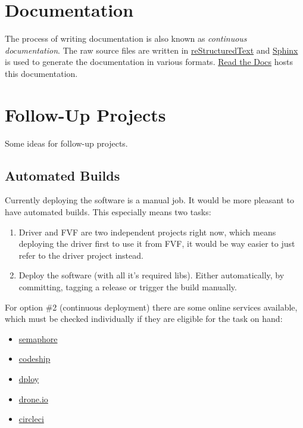 \chapter{Documentation}
\label{development/documentation:documentation}\label{development/documentation::doc}
The process of writing documentation is also known as \emph{continuous documentation}. The raw source files are written in \href{http://docutils.sourceforge.net/rst.html}{reStructuredText} and \href{http://sphinx-doc.org}{Sphinx} is used to generate the documentation in various formats. \href{http://readthedocs.org}{Read the Docs} hosts this documentation.


\chapter{Follow-Up Projects}
\label{development/follow-ups::doc}\label{development/follow-ups:sphinx}\label{development/follow-ups:follow-up-projects}
Some ideas for follow-up projects.


\section{Automated Builds}
\label{development/follow-ups:automated-builds}
Currently deploying the software is a manual job. It would be more pleasant to have automated builds. This especially means two tasks:
\begin{enumerate}
\item {} 
Driver and FVF are two independent projects right now, which means deploying the driver first to use it from FVF, it would be way easier to just refer to the driver project instead.

\item {} 
Deploy the software (with all it's required libs). Either automatically, by committing, tagging a release or trigger the build manually.

\end{enumerate}

For option \#2 (continuous deployment) there are some online services available, which must be checked individually if they are eligible for the task on hand:
\begin{itemize}
\item {} 
\href{https://semaphoreci.com}{semaphore}

\item {} 
\href{https://codeship.com}{codeship}

\item {} 
\href{http://dploy.io}{dploy}

\item {} 
\href{https://drone.io}{drone.io}

\item {} 
\href{https://circleci.com}{circleci}

\end{itemize}

